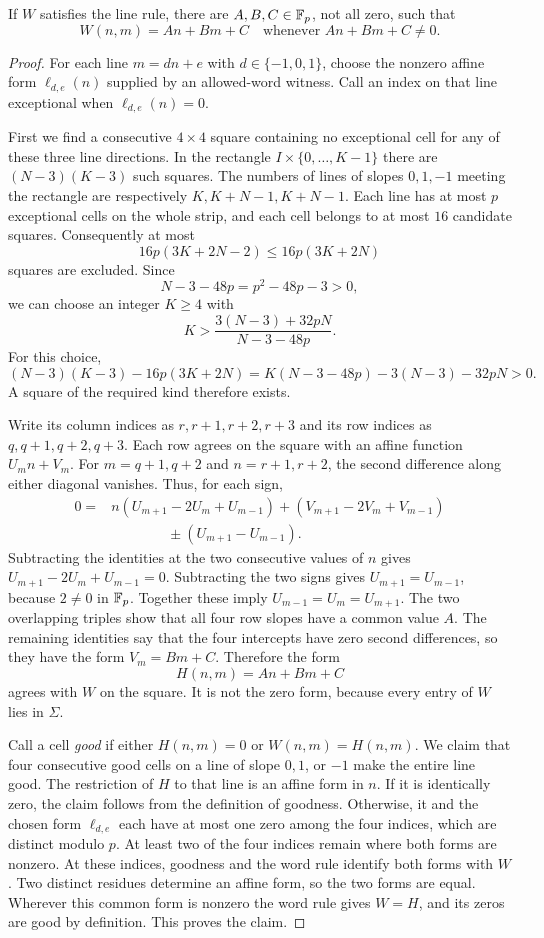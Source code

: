 \begin{lemma}
\label{word:affine}
If $W$ satisfies the line rule, there are $A,B,C\in\mathbb F_p$, not all zero,
such that
\[
    W(n,m)=An+Bm+C
    \quad\text{whenever }An+Bm+C\ne0.
\]
\end{lemma}

\begin{proof}
For each line $m=dn+e$ with $d\in\{-1,0,1\}$, choose the nonzero affine
form $\ell_{d,e}(n)$ supplied by an allowed-word witness.  Call an index on
that line exceptional when $\ell_{d,e}(n)=0$.

First we find a consecutive $4\times4$ square containing no exceptional
cell for any of these three line directions.  In the rectangle
$I\times\{0,\ldots,K-1\}$ there are $(N-3)(K-3)$ such squares.  The
numbers of lines of slopes $0,1,-1$ meeting the rectangle are respectively
$K,K+N-1,K+N-1$.  Each line has at most $p$ exceptional cells on the
whole strip, and each cell belongs to at most $16$ candidate squares.
Consequently at most
\[
    16p(3K+2N-2)\leq16p(3K+2N)
\]
squares are excluded.  Since
\[
    N-3-48p=p^2-48p-3>0,
\]
we can choose an integer $K\geq4$ with
\[
    K>\frac{3(N-3)+32pN}{N-3-48p}.
\]
For this choice,
\[
    (N-3)(K-3)-16p(3K+2N)
      =K(N-3-48p)-3(N-3)-32pN>0.
\]
A square of the required kind therefore exists.

Write its column indices as $r,r+1,r+2,r+3$ and its row indices as
$q,q+1,q+2,q+3$.  Each row agrees on the square with an affine function
$U_m n+V_m$.  For $m=q+1,q+2$ and $n=r+1,r+2$, the second difference
along either diagonal vanishes.  Thus, for each sign,
\[
 \begin{split}
  0={}&n(U_{m+1}-2U_m+U_{m-1})
       +(V_{m+1}-2V_m+V_{m-1})\\
     &\qquad\qquad{}\pm(U_{m+1}-U_{m-1}).
 \end{split}
\]
Subtracting the identities at the two consecutive values of $n$ gives
$U_{m+1}-2U_m+U_{m-1}=0$.  Subtracting the two signs gives
$U_{m+1}=U_{m-1}$, because $2\ne0$ in $\mathbb F_p$.  Together these imply
$U_{m-1}=U_m=U_{m+1}$.  The two overlapping triples show that all four
row slopes have a common value $A$.  The remaining identities say that
the four intercepts have zero second differences, so they have the form
$V_m=Bm+C$.  Therefore the form
\[
    H(n,m)=An+Bm+C
\]
agrees with $W$ on the square.  It is not the zero form, because every
entry of $W$ lies in $\Sigma$.

Call a cell \emph{good} if either $H(n,m)=0$ or $W(n,m)=H(n,m)$.  We claim
that four consecutive good cells on a line of slope $0,1$, or $-1$ make
the entire line good.  The restriction of $H$ to that line is an affine
form in $n$.  If it is identically zero, the claim follows from the
definition of goodness.  Otherwise, it and the chosen form
$\ell_{d,e}$ each have at most one zero among the four indices, which
are distinct modulo $p$.  At least two of the four indices remain where
both forms are nonzero.  At these indices, goodness and the word rule
identify both forms with $W$.  Two distinct residues determine an
affine form, so the two forms are equal.  Wherever this common form is
nonzero the word rule gives $W=H$, and its zeros are good by definition.
This proves the claim.


\end{proof}
